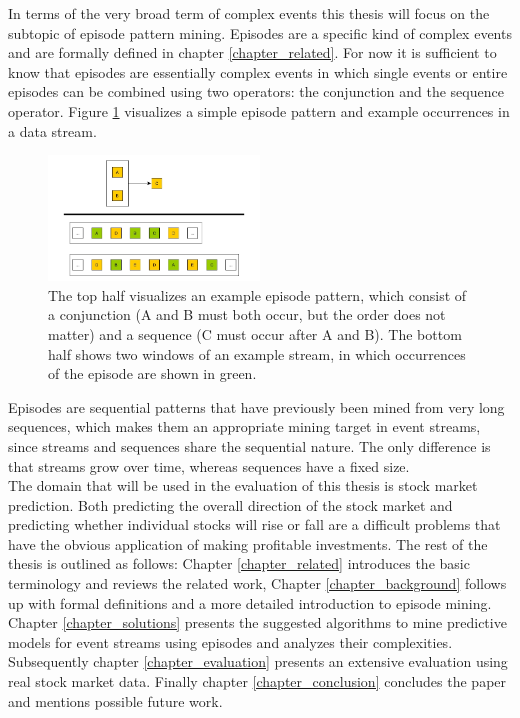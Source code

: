In terms of the very broad term of complex events this thesis will focus on the subtopic of episode pattern mining. Episodes are a specific kind of complex events and are formally defined in chapter \ref{chapter_related}. For now it is sufficient to know that episodes are essentially complex events in which single events or entire episodes can be combined using two operators: the conjunction and the sequence operator. Figure \ref{fig_simpleEpisodeExample} visualizes a simple episode pattern and example occurrences in a data stream.

\begin{figure}[h]
	\centering
  	\includegraphics[width=0.5\textwidth]{exampleEpisode.jpg}
	\caption{The top half visualizes an example episode pattern, which consist of a conjunction (A and B must both occur, but the order does not matter) and a sequence (C must occur after A and B). The bottom half shows two windows of an example stream, in which occurrences of the episode are shown in green.}
	\label{fig_simpleEpisodeExample}
\end{figure}

Episodes are sequential patterns that have previously been mined from very long sequences, which makes them an appropriate mining target in event streams, since streams and sequences share the sequential nature. The only difference is that streams grow over time, whereas sequences have a fixed size.\\
The domain that will be used in the evaluation of this thesis is stock market prediction. Both predicting the overall direction of the stock market and predicting whether individual stocks will rise or fall are a difficult problems that have the obvious application of making profitable investments. \newline
The rest of the thesis is outlined as follows: Chapter \ref{chapter_related} introduces the basic terminology and reviews the related work, Chapter \ref{chapter_background} follows up with formal definitions and a more detailed introduction to episode mining. Chapter \ref{chapter_solutions} presents the suggested algorithms to mine predictive models for event streams using episodes and analyzes their complexities. Subsequently chapter \ref{chapter_evaluation} presents an extensive evaluation using real stock market data. Finally chapter \ref{chapter_conclusion} concludes the paper and mentions possible future work.


